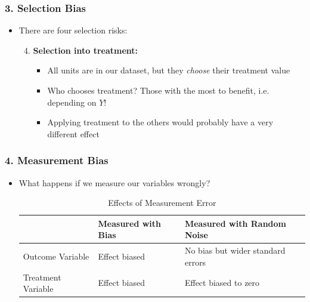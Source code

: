 \documentclass[xcolor=x11names,compress]{beamer}\usepackage[]{graphicx}\usepackage[]{color}
\renewcommand{\(}{\begin{columns}}
\renewcommand{\)}{\end{columns}}
\newcommand{\<}[1]{\begin{column}{#1}}
\renewcommand{\>}{\end{column}}
\begin{document}
\begin{frame}
\frametitle{3. Selection Bias}
\begin{itemize}
\item There are four selection risks:
\begin{enumerate}
\setcounter{enumi}{3}
\item \textbf{Selection into treatment:}
\begin{itemize}
\item All units are in our dataset, but they \textit{choose} their treatment value
\item Who chooses treatment? Those with the most to benefit, i.e. depending on $Y$!
\item Applying treatment to the others would probably have a very different effect
\end{itemize}
\end{enumerate}
\end{itemize}
\end{frame}

\begin{frame}
\frametitle{4. Measurement Bias}
\begin{itemize}
\item What happens if we measure our variables wrongly?
\footnotesize
\begin{table}[htbp]
  \centering
  \caption{Effects of Measurement Error}
    \begin{tabular}{|l|l|p{4cm}|}
    \hline
          & Measured with Bias & Measured with Random Noise \bigstrut\\
    \hline
    Outcome Variable & Effect biased & No bias but wider standard errors \bigstrut\\
    \hline
    Treatment Variable & Effect biased & Effect biased to zero \bigstrut\\
    \hline
    \end{tabular}%
  \label{tab:addlabel}%
\end{table}%
\normalsize
\end{itemize}
\end{frame}
\end{document}
